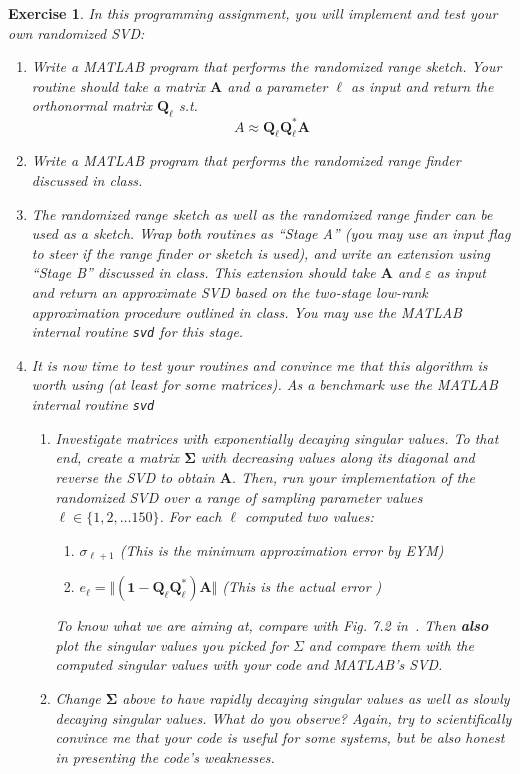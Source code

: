 \documentclass[11pt]{article}
\newcommand{\bgk}[1]{\boldsymbol{#1}}
\newcommand{\bone}{\bgk{1}}
\newcommand{\bSigma}{\bgk{\Sigma}}
\newcommand{\bvec}[1]{\mathbf{#1}}
\newcommand{\vA}{\bvec{A}}
\newcommand{\vQ}{\bvec{Q}}
\newtheorem{exercise}[theorem]{Exercise}
\begin{document}
\begin{exercise}
In this programming assignment, you will implement and test your own randomized SVD:
\begin{enumerate}
    \item Write a MATLAB program that performs the randomized range sketch. Your routine should take a matrix $\vA$ and a parameter $\ell$ as input and return the orthonormal matrix $\vQ_\ell$ s.t. 
    $$
    A \approx \vQ_\ell \vQ_\ell^* \vA
    $$
    \item Write a MATLAB program that performs the randomized range finder discussed in class.
    \item The randomized range sketch as well as the randomized range finder can be used as a sketch. Wrap both routines as ``Stage A'' (you may use an input flag to steer if the range finder or sketch is used), and write an extension using ``Stage B'' discussed in class. This extension should take $\vA$ and $\varepsilon$ as input and return an approximate SVD based on the two-stage low-rank approximation procedure outlined in class. You may use the MATLAB internal routine \texttt{svd} for this stage.
    \item It is now time to test your routines and convince me that this algorithm is worth using (at least for some matrices). As a benchmark use the MATLAB internal routine \texttt{svd}
    \begin{enumerate}
        \item Investigate matrices with exponentially decaying singular values. To that end, create a matrix $\bSigma$ with decreasing values along its diagonal and reverse the SVD to obtain $\vA$. Then, run your implementation of the randomized SVD over a range of sampling parameter values $\ell \in \{1,2,…150\}$. 
        For each $\ell$ computed two values:
        \begin{enumerate}
            \item[$\bullet$] $\sigma_{\ell +1}$ (This is the minimum approximation error by EYM) 
            \item[$\bullet$] $e_\ell = \Vert  (\bone - \vQ_\ell \vQ_\ell^*)\vA\Vert$ (This is the actual error )
        \end{enumerate}
        To know what we are aiming at, compare with Fig. 7.2 in~\cite{halko2011finding}. 
        Then {\bf also} plot the singular values you picked for $\Sigma$ and compare them with the computed singular values with your code and MATLAB's SVD.
        \item Change $\bSigma$ above to have rapidly decaying singular values as well as slowly decaying singular values. What do you observe? Again, try to scientifically convince me that your code is useful for some systems, but be also honest in presenting the code's weaknesses.

\end{enumerate}
\end{enumerate}
\end{exercise}
\end{document}
